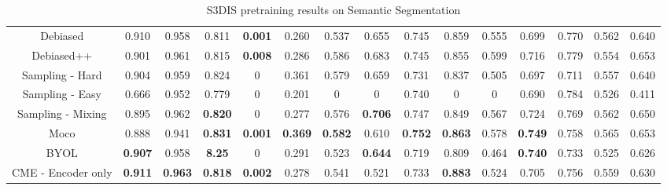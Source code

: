 \documentclass[12pt]{article}
\begin{document}
\begin{center}
\begin{table}[h!]
{\begin{tabular}{ c | c c c c c c c c c c c c c | c }
                \hline
                Debiased \cite{chuang_debiased_2020}            & 0.910          & 0.958          & 0.811          & \textbf{0.001} & 0.260          & 0.537          & 0.655          & 0.745          & 0.859          & 0.555          & 0.699          & 0.770          & 0.562          & 0.640          \\
                Debiased++ \cite{robinson_contrastive_2021}     & 0.901          & 0.961          & 0.815          & \textbf{0.008} & 0.286          & 0.586          & 0.683          & 0.745          & 0.855          & 0.599          & 0.716          & 0.779          & 0.554          & 0.653          \\
                \hline
                Sampling - Hard                                 & 0.904          & 0.959          & 0.824          & 0              & 0.361          & 0.579          & 0.659          & 0.731          & 0.837          & 0.505          & 0.697          & 0.711          & 0.557          & 0.640          \\
                Sampling - Easy                                 & 0.666          & 0.952          & 0.779          & 0              & 0.201          & 0              & 0              & 0.740          & 0              & 0              & 0.690          & 0.784          & 0.526          & 0.411          \\
                Sampling - Mixing \cite{kalantidis_hard_nodate} & 0.895          & 0.962          & \textbf{0.820} & 0              & 0.277          & 0.576          & \textbf{0.706} & 0.747          & 0.849          & 0.567          & 0.724          & 0.769          & 0.562          & 0.650          \\
                \hline
                Moco \cite{he_momentum_2020}                    & 0.888          & 0.941          & \textbf{0.831} & \textbf{0.001} & \textbf{0.369} & \textbf{0.582} & 0.610          & \textbf{0.752} & \textbf{0.863} & 0.578          & \textbf{0.749} & 0.758          & 0.565          & 0.653          \\
                BYOL \cite{grill_bootstrap_nodate}              & \textbf{0.907} & 0.958          & \textbf{8.25}  & 0              & 0.291          & 0.523          & \textbf{0.644} & 0.719          & 0.809          & 0.464          & \textbf{0.740} & 0.733          & 0.525          & 0.626          \\
                \hline
                CME - Encoder only                              & \textbf{0.911} & \textbf{0.963} & \textbf{0.818} & \textbf{0.002} & 0.278          & 0.541          & 0.521          & 0.733          & \textbf{0.883} & 0.524          & 0.705          & 0.756          & 0.559          & 0.630          \\
            \end{tabular}
        }
        \caption{S3DIS pretraining results on Semantic Segmentation}
    \end{table}
\end{center}


\pagebreak

\newpage


\end{document}
